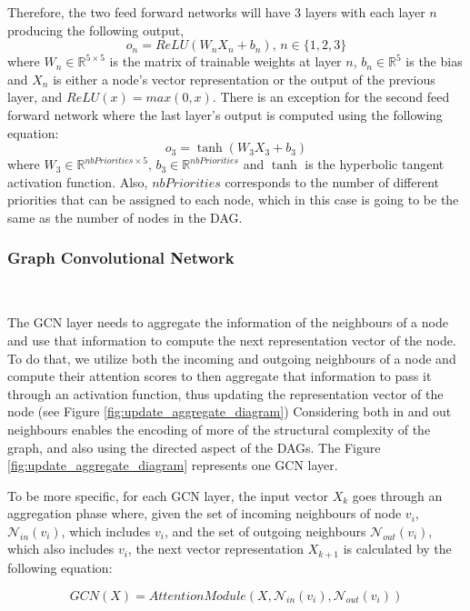 Therefore, the two feed forward networks will have 3 layers with each 
layer $n$ producing the following output,
\begin{equation}
    o_{n} = ReLU(W_{n}X_{n} + b_n),\, n \in \{1,2,3\}
\end{equation}
where $W_n \in \mathbb{R}^{5\times5}$ is the matrix of trainable weights
at layer $n$, $b_n \in \mathbb{R}^5$ is the bias and $X_n$ is either a node's vector representation
or the output of the previous layer, and $ReLU(x) = max(0, x)$.
There is an exception for the second feed forward network where the last 
layer's output is computed using the following equation:
\begin{equation}
    o_{3} = \tanh(W_{3}X_{3} + b_3)
\end{equation}
where $W_3 \in \mathbb{R}^{nbPriorities \times 5}$,
$b_3 \in \mathbb{R}^{nbPriorities}$ and $\tanh$ is the 
hyperbolic tangent activation function.
Also, $nbPriorities$ corresponds to the number of different priorities
that can be assigned to each node, which in this case is going to be the same as the number of nodes in the DAG.


\subsubsection{Graph Convolutional Network}
~

The GCN layer needs to aggregate the information 
of the neighbours of a node and use that information
to compute the next representation vector of the node.
To do that, we utilize both the incoming and outgoing neighbours
of a node and compute their attention scores to then aggregate
that information to pass it through an activation 
function, thus updating the representation vector of the node (see Figure \ref{fig:update_aggregate_diagram})
Considering both in and out neighbours enables the encoding
of more of the structural complexity of the graph, and also
using the directed aspect of the DAGs.
The Figure \ref{fig:update_aggregate_diagram} represents
one GCN layer.

To be more specific, for each GCN layer, the input vector $X_k$ 
goes through an aggregation phase where,
given the set of incoming neighbours of node $v_i$, $\mathcal{N}_{in}(v_i)$, which includes
$v_i$, and the set of outgoing neighbours $\mathcal{N}_{out}(v_i)$, which also includes $v_i$,
the next vector representation $X_{k+1}$ is calculated by the following equation:

\begin{equation}
GCN(X) = AttentionModule(X, \mathcal{N}_{in}(v_i), \mathcal{N}_{out}(v_i))
\end{equation}

